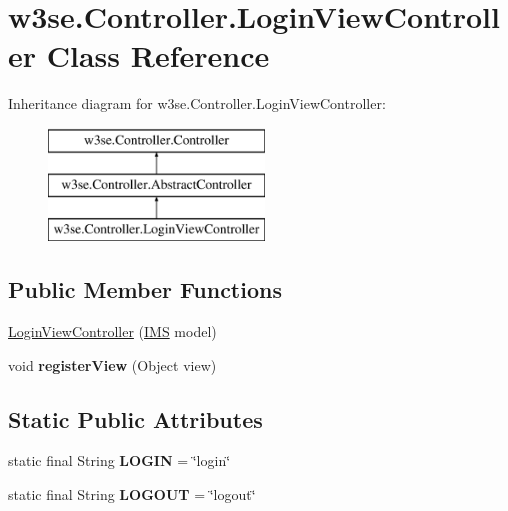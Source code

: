 \hypertarget{classw3se_1_1_controller_1_1_login_view_controller}{\section{w3se.\-Controller.\-Login\-View\-Controller Class Reference}
\label{classw3se_1_1_controller_1_1_login_view_controller}
}
Inheritance diagram for w3se.\-Controller.\-Login\-View\-Controller\-:\begin{figure}[H]
\begin{center}
\leavevmode
\includegraphics[height=3.000000cm]{classw3se_1_1_controller_1_1_login_view_controller}
\end{center}
\end{figure}
\subsection*{Public Member Functions}
\begin{DoxyCompactItemize}
\item 
\hyperlink{classw3se_1_1_controller_1_1_login_view_controller_a8659ca95d4df9fcbde00c6b8a2d475b5}{Login\-View\-Controller} (\hyperlink{classw3se_1_1_model_1_1_i_m_s}{I\-M\-S} model)
\item 
\hypertarget{classw3se_1_1_controller_1_1_login_view_controller_af60c603b9e879d8f4944d589b4d2ce3d}{void {\bfseries register\-View} (Object view)}\label{classw3se_1_1_controller_1_1_login_view_controller_af60c603b9e879d8f4944d589b4d2ce3d}

\end{DoxyCompactItemize}
\subsection*{Static Public Attributes}
\begin{DoxyCompactItemize}
\item 
\hypertarget{classw3se_1_1_controller_1_1_login_view_controller_ace9495f4f010d587e8c294be448febd8}{static final String {\bfseries L\-O\-G\-I\-N} = \char`\"{}login\char`\"{}}\label{classw3se_1_1_controller_1_1_login_view_controller_ace9495f4f010d587e8c294be448febd8}

\item 
\hypertarget{classw3se_1_1_controller_1_1_login_view_controller_a42f673c181099b181f7d0ef9b8367a69}{static final String {\bfseries L\-O\-G\-O\-U\-T} = \char`\"{}logout\char`\"{}}\label{classw3se_1_1_controller_1_1_login_view_controller_a42f673c181099b181f7d0ef9b8367a69}

\end{DoxyCompactItemize}
